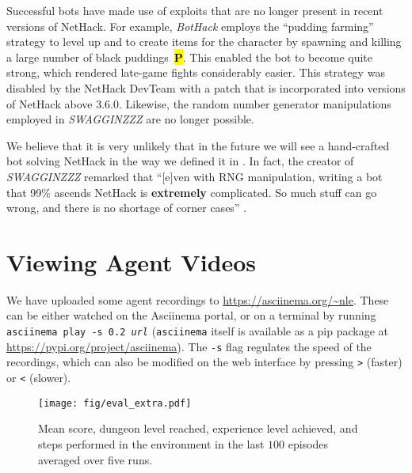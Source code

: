 \documentclass{article}
\newcommand{\nethack}{NetHack}
\newcommand{\BlackPudding}{{\bf\ttfamily\color{nethack_gray}\sethlcolor{black}\hl{P}}}
\begin{document}
Successful bots have made use of exploits that are no longer present in recent versions of NetHack. For example, \emph{BotHack} employs the ``pudding farming'' strategy \citep[see][``Pudding farming'' entry]{nhwiki} to level up and to create items for the character by spawning and killing a large number of black puddings~\BlackPudding{}. This enabled the bot to become quite strong, which rendered late-game fights considerably easier. This strategy was disabled by the \nethack{} DevTeam with a patch that is incorporated into versions of \nethack{} above 3.6.0. Likewise, the random number generator manipulations employed in \emph{SWAGGINZZZ} are no longer possible.

We believe that it is very unlikely that in the future we will see a hand-crafted bot solving NetHack in the way we defined it in .
In fact, the creator of \emph{SWAGGINZZZ} remarked that ``[e]ven with RNG manipulation, writing a bot that 99\% ascends NetHack is \textbf{extremely} complicated. So much stuff can go wrong, and there is no shortage of corner cases'' \citep{swagginzzz}.


\section{Viewing Agent Videos}
\label{sec:runsamples}

We have uploaded some agent recordings to \url{https://asciinema.org/~nle}. These can be either watched on the Asciinema portal, or on a terminal by running \texttt{asciinema play -s 0.2 \textit{url}} (\texttt{asciinema} itself is available as a pip package at \url{https://pypi.org/project/asciinema}). The \texttt{-s} flag regulates the speed of the recordings, which can also be modified on the web interface by pressing \texttt{>} (faster) or \texttt{<} (slower).

\begin{figure*}[t!]
    \centering \texttt{[image: fig/eval\_extra.pdf]}
    \caption{Mean score, dungeon level reached, experience level achieved, and steps performed in the environment in the last $100$ episodes averaged over five runs.}
    \label{fig:eval_extra}
\end{figure*}
\end{document}
